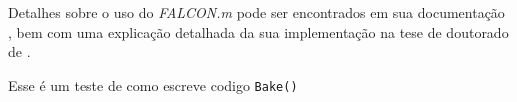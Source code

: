 Detalhes sobre o uso do \textit{FALCON.m} pode ser encontrados em sua documentação \cite{manual:Falcon}, bem com uma explicação detalhada da sua implementação na tese de doutorado de \citeauthor{phd:Rieck}.


Esse é um teste de como escreve codigo  \lstinline[style=Matlab-editor]{Bake()}

\clearpage